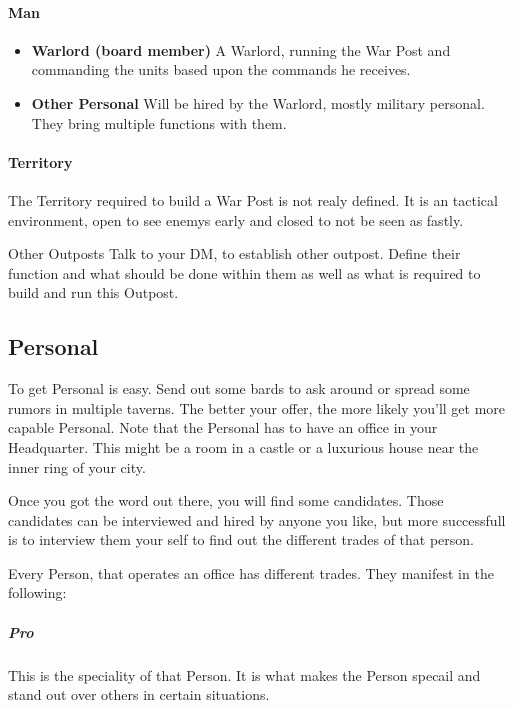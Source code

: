 \paragraph{Man}
\begin{itemize}
\item \textbf{Warlord (board member)} A Warlord, running the War Post and commanding the units based upon the commands he receives.
\item \textbf{Other Personal} Will be hired by the Warlord, mostly military personal. They bring multiple functions with them.
\end{itemize}

\paragraph{Territory}

The Territory required to build a War Post is not realy defined. It is an tactical environment, open to see enemys early and closed to not be seen as fastly.

\begin{commentbox}{Other Outposts}
Talk to your DM, to establish other outpost. Define their function and what should be done within them as well as what is required to build and run this Outpost.
\end{commentbox}

\subsection{Personal}

To get Personal is easy. Send out some bards to ask around or spread some rumors in multiple taverns. The better your offer, the more likely you'll get more capable Personal. Note that the Personal has to have an office in your Headquarter. This might be a room in a castle or a luxurious house near the inner ring of your city.

Once you got the word out there, you will find some candidates. Those candidates can be interviewed and hired by anyone you like, but more successfull is to interview them your self to find out the different trades of that person.

Every Person, that operates an office has different trades. They manifest in the following:

\subparagraph{Pro} This is the speciality of that Person. It is what makes the Person specail and stand out over others in certain situations.

